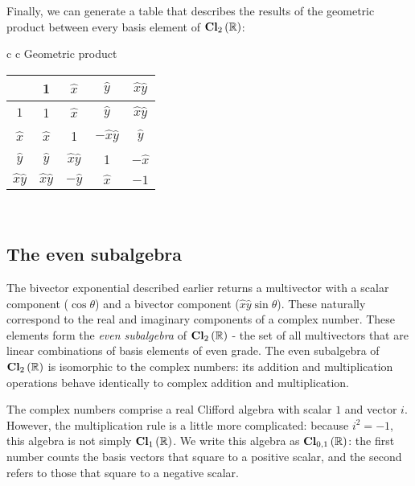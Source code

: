 Finally, we can generate a table that describes the results of the geometric product between every
basis element of $\operatorname{\mathbf{Cl}}_{2}\left(\mathbb{R}\right)$:
\begin{center}
\begin{tabular}{c c}
    Geometric product \\
    \begin{tabular}{ c | c  c  c  c }
                            & 1                 & $\hat{x}$         & $\hat{y}$         & $\hat{x}\hat{y}$  \\ \hline
        $1$                 & 1                 & $\hat{x}$         & $\hat{y}$         & $\hat{x}\hat{y}$  \\
        $\hat{x}$           & $\hat{x}$         & 1                 & $-\hat{x}\hat{y}$ & $\hat{y}$         \\
        $\hat{y}$           & $\hat{y}$         & $\hat{x}\hat{y}$  & 1                 & $-\hat{x}$        \\
        $\hat{x}\hat{y}$    & $\hat{x}\hat{y}$  & $-\hat{y}$        & $\hat{x}$         & $-1$              \\
    \end{tabular} \\
\end{tabular} 
\end{center}

\subsection{The even subalgebra}

The bivector exponential described earlier returns a multivector with a scalar component
($\cos\theta$) and a bivector component ($\hat{x}\hat{y} \sin\theta$). These naturally correspond to
the real and imaginary components of a complex number. These elements form the \textit{even
subalgebra} of $\operatorname{\mathbf{Cl}}_{2}\left(\mathbb{R}\right)$ - the set of all multivectors that are linear combinations of basis
elements of even grade. The even subalgebra of $\operatorname{\mathbf{Cl}}_{2}\left(\mathbb{R}\right)$ is isomorphic to the complex numbers: its
addition and multiplication operations behave identically to complex addition and multiplication.

The complex numbers comprise a real Clifford algebra with scalar $1$ and vector $i$. However, the
multiplication rule is a little more complicated: because $i^2 = -1$, this algebra is not simply
$\operatorname{\mathbf{Cl}}_{1}\left(\mathbb{R}\right)$. We write this algebra as $\operatorname{\mathbf{Cl}}_{0,1}\left(\mathbb{R}\right)$: the first number counts the basis vectors that
square to a positive scalar, and the second refers to those that square to a negative scalar.

